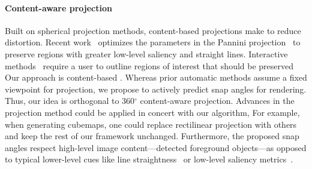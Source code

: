 \paragraph{Content-aware projection}
Built on spherical projection methods, content-based projections make  to reduce distortion.
Recent work~\cite{kim2017automatic} optimizes the parameters in the Pannini projection~\cite{sharpless2010pannini} to preserve regions with greater low-level saliency and straight lines.  Interactive methods~\cite{carroll2009optimizing,tehrani2016correcting,carroll2010image,kopf2009locally} require a user to outline regions of interest that should be preserved
Our approach is content-based .  Whereas prior automatic methods assume a fixed viewpoint for projection, we propose to actively predict snap angles for rendering.  
Thus, our idea is orthogonal to 360$^{\circ}$ content-aware projection.  Advances in the projection method could be applied in concert with our algorithm,   For example, when generating cubemaps, one could replace rectilinear projection with others~\cite{sharpless2010pannini,kim2017automatic,carroll2009optimizing} and keep the rest of our  framework unchanged.
Furthermore, the proposed snap angles respect high-level image content---detected foreground objects---as opposed to typical lower-level cues like line straightness~\cite{carroll2010image,carroll2009optimizing} or low-level saliency metrics~\cite{kim2017automatic}.

\vspace*{-0.1in}
